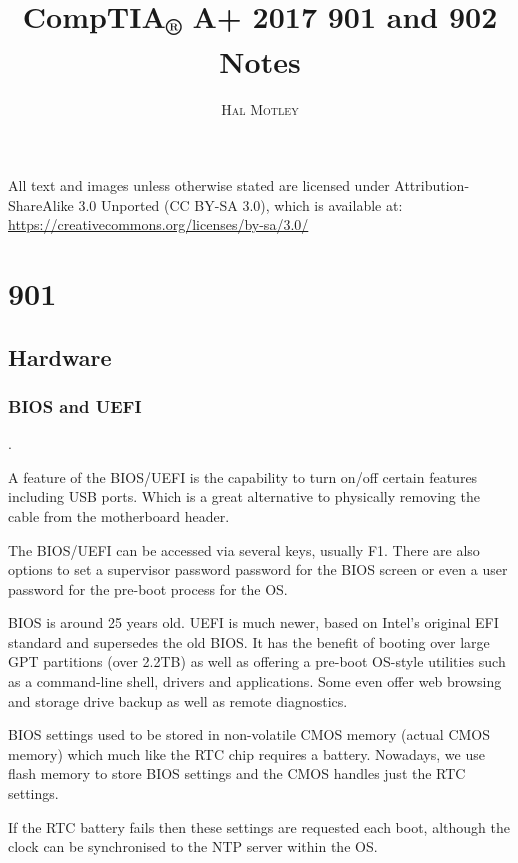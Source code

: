 \documentclass{article}
\title{CompTIA\textsubscript{®} A+ 2017 901 and 902 Notes}
\author{\textsc{Hal Motley}}
\date{}
\begin{document}
\maketitle

\begin{center}
    All text and images unless otherwise stated are licensed under Attribution-ShareAlike 3.0 Unported (CC BY-SA 3.0), which is available at: \url{https://creativecommons.org/licenses/by-sa/3.0/}
\end{center}

\chapter{901}

\section{Hardware}

\subsection{BIOS and UEFI}

.

A feature of the BIOS/UEFI is the capability to turn on/off certain features including USB ports. Which is a great alternative to physically removing the cable from the motherboard header.

The BIOS/UEFI can be accessed via several keys, usually F1. There are also options to set a supervisor password password for the BIOS screen or even a user password for the pre-boot process for the OS.

BIOS is around 25 years old. UEFI is much newer, based on Intel's original EFI standard and supersedes the old BIOS. It has the benefit of booting over large GPT partitions (over 2.2TB) as well as offering a pre-boot OS-style utilities such as a command-line shell, drivers and applications. Some even offer web browsing and storage drive backup as well as remote diagnostics.

BIOS settings used to be stored in non-volatile CMOS memory (actual CMOS memory) which much like the RTC chip requires a battery. Nowadays, we use flash memory to store BIOS settings and the CMOS handles just the RTC settings.

If the RTC battery fails then these settings are requested each boot, although the clock can be synchronised to the NTP server within the OS.
\end{document}
